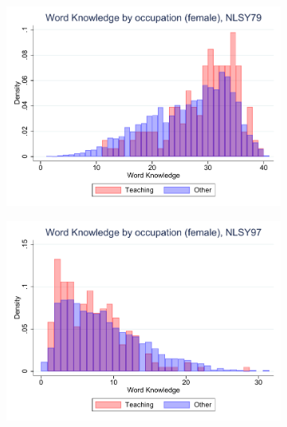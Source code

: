 \documentclass[11pt]{beamer}
\begin{document}
\begin{frame}
\begin{adjustwidth}{2em}{2em}
\begin{figure}[ht!]
\begin{subfigure}[b]{0.27\textwidth}
				\includegraphics[width=\textwidth]{plots/nlsy79_wk_occ_no_norm_female_no_lf.pdf}
			\end{subfigure}
			\hfill
			\begin{subfigure}[b]{0.27\textwidth}
				\centering
				\includegraphics[width=\textwidth]{plots/nlsy97_wk_occ_no_norm_female_no_lf.pdf}
			\end{subfigure}	
		\end{figure}
		\vfill
	\end{adjustwidth}
\end{frame}
\end{document}
